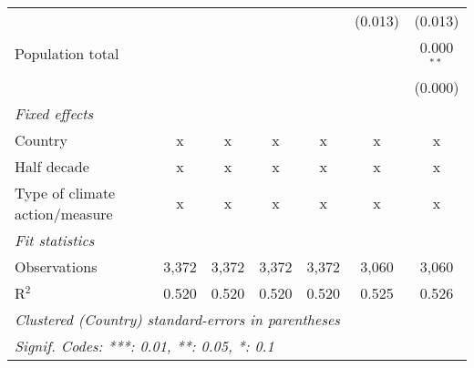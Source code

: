 \begin{tabular}{lcccccc}
                                                 &         &         &         &         & (0.013)     & (0.013)\\   
   Population total                              &         &         &         &         &             & 0.000$^{**}$\\   
                                                 &         &         &         &         &             & (0.000)\\   
   \emph{Fixed effects}\\
   Country                                       & x       & x       & x       & x       & x           & x\\  
   Half decade                                   & x       & x       & x       & x       & x           & x\\  
   Type of climate action/measure                & x       & x       & x       & x       & x           & x\\  
   \midrule \emph{Fit statistics}\\
   Observations                                  & 3,372   & 3,372   & 3,372   & 3,372   & 3,060       & 3,060\\  
   R$^2$                                         & 0.520   & 0.520   & 0.520   & 0.520   & 0.525       & 0.526\\  
   \midrule
   \multicolumn{7}{l}{\emph{Clustered (Country) standard-errors in parentheses}}\\
   \multicolumn{7}{l}{\emph{Signif. Codes: ***: 0.01, **: 0.05, *: 0.1}}\\
\end{tabular}
\par\endgroup


